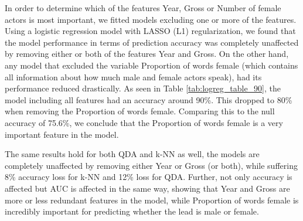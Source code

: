 \documentclass[../../project.tex]{subfiles}
\begin{document}
	In order to determine which of the features Year, Gross or Number of female actors is most important, we fitted models excluding one or more of the features. Using a logistic regression model with LASSO (L1) regularization, we found that the model performance in terms of prediction accuracy was completely unaffected by removing either or both of the features Year and Gross. On the other hand, any model that excluded the variable Proportion of words female (which contains all information about how much male and female actors speak), had its performance reduced drastically. As seen in Table \ref{tab:logreg_table_90}, the model including all features had an accuracy around 90\%. This dropped to 80\% when removing the Proportion of words female. Comparing this to the null accuracy of 75.6\%, we conclude that the Proportion of words female is a very important feature in the model.
	
	The same results hold for both QDA and k-NN as well, the models are completely unaffected by removing either Year or Gross (or both), while suffering 8\% accuracy loss for k-NN and 12\% loss for QDA. Further, not only accuracy is affected but AUC is affected in the same way, showing that Year and Gross are more or less redundant features in the model, while Proportion of words female is incredibly important for predicting whether the lead is male or female.
\end{document}

